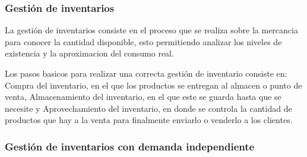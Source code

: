 \subsubsection{Gestión de inventarios}

La gestión de inventarios consiste en el proceso que se realiza sobre la mercancia para conocer la cantidad disponible, esto permitiendo analizar los niveles de existencia y la aproximacion del consumo real.\cite{meana2024gestion}

Los pasos basicos para realizar una correcta gestión de inventario consiste en: Compra del inventario, en el que los productos se entregan al almacen o punto de venta, Almacenamiento del inventario, en el que este se guarda hasta que se necesite y Aprovechamiento del inventario, en donde se controla la cantidad de productos que hay a la venta para finalmente enviarlo o venderlo a los clientes.\cite{ibm_inventario}




    

\subsubsection{Gestión de inventarios con demanda independiente}  %

